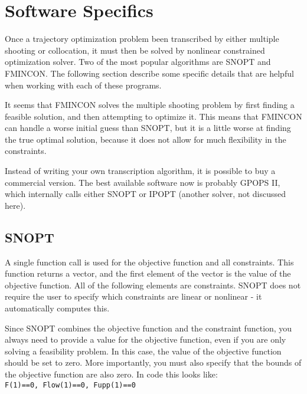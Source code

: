 \section{Software Specifics}

Once a trajectory optimization problem been transcribed by either multiple shooting or collocation, it must then be solved by nonlinear constrained optimization solver. Two of the most popular algorithms are SNOPT and FMINCON. The following section describe some specific details that are helpful when working with each of these programs.

\par It seems that FMINCON solves the multiple shooting problem by first finding a feasible solution, and then attempting to optimize it. This means that FMINCON can handle a worse initial guess than SNOPT, but it is a little worse at finding the true optimal solution, because it does not allow for much flexibility in the constraints. 

\par Instead of writing your own transcription algorithm, it is possible to buy a commercial version. The best available software now is probably GPOPS II, which internally calls either SNOPT or IPOPT (another solver, not discussed here). 

\subsection{SNOPT \cite{Gill2005}}


	\par A single function call is used for the objective function and all constraints. This function returns a vector, and the first element of the vector is the value of the objective function. All of the following elements are constraints. SNOPT does not require the user to specify which constraints are linear or nonlinear - it automatically computes this.

	\par Since SNOPT combines the objective function and the constraint function, you always need to provide a value for the objective function, even if you are only solving a feasibility problem. In this case, the value of the objective function should be set to zero. More importantly, you must also specify that the bounds of the objective function are also zero. In code this looks like: \\
					\texttt{F(1)==0, Flow(1)==0, Fupp(1)==0}

